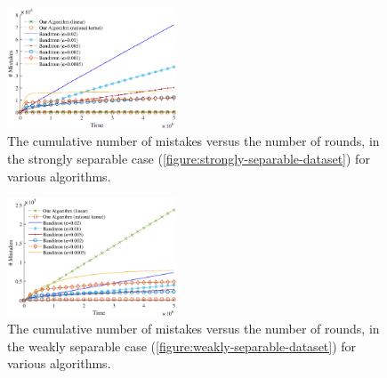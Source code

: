 
\begin{figure}
\centering
\includegraphics[width=0.45\textwidth]{figures/strong3}
\caption{The cumulative number of mistakes versus the number of rounds,
in the strongly separable case (\autoref{figure:strongly-separable-dataset}) for various algorithms.}
\label{figure:number-of-mistakes-strongly-separable-dataset}
\end{figure}

\begin{figure}
\centering
\includegraphics[width=0.45\textwidth]{figures/weak3}
\caption{The cumulative number of mistakes versus the number of rounds,
in the weakly separable case (\autoref{figure:weakly-separable-dataset}) for various algorithms.}
\label{figure:number-of-mistakes-weakly-separable-dataset}
\end{figure}
